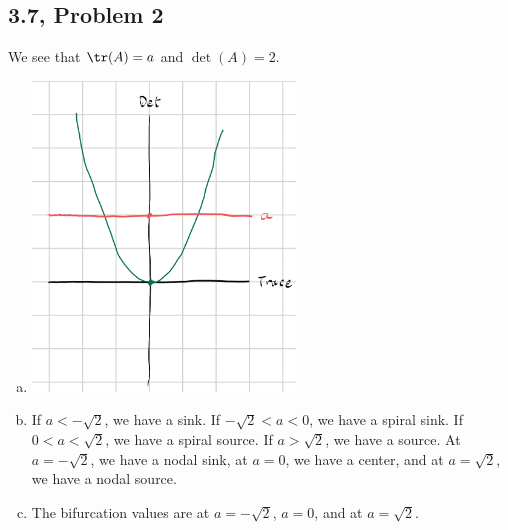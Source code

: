 \documentclass[10pt]{mypackage}
\begin{document}
\subsection{3.7, Problem 2}%
We see that $\tr(A) = a$ and $\det(A) = 2$.\newline
\begin{enumerate}[(a)]
  \item \hfill
    \begin{center}
      \includegraphics[width=7cm]{images/3_7_2a.png}
    \end{center}
  \item If $a < -\sqrt{2}$, we have a sink. If $-\sqrt{2} < a < 0$, we have a spiral sink. If $0 < a < \sqrt{2}$, we have a spiral source. If $a > \sqrt{2}$, we have a source. At $a = -\sqrt{2}$, we have a nodal sink, at $a = 0$, we have a center, and at $a = \sqrt{2}$, we have a nodal source.
  \item The bifurcation values are at $a = -\sqrt{2}$, $a = 0$, and at $a = \sqrt{2}$.
\end{enumerate}
\end{document}
